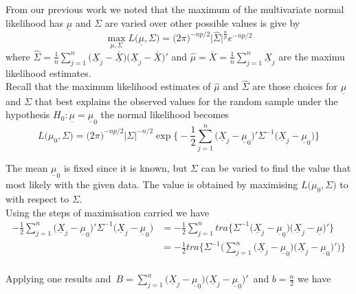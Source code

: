 \documentclass[11pt,a4paper]{article}
\theoremstyle{definition}
\begin{document}
From our previous work we noted that the maximum of the multivariate normal likelihood has $\underline{\mu}$ and $\Sigma$ are varied over other possible values is give by 
\begin{equation}\tag{1}
\max\limits_{\mu, \Sigma} L\big(\underline{\mu},\Sigma\big) = \big(2\pi\big)^{-np/2}\big|\widehat{\Sigma}\big|^{\frac{n}{p}}e^{-np/2}
\end{equation} where $\displaystyle{\widehat{\Sigma}=\frac{1}{n}\sum^n_{j=1}\big(\underline{X}_j-\overline{\underline{X}}\big)\big(\underline{X}_j-\overline{\underline{X}}\big)'}$ and $\displaystyle{\widehat{\mu}=\overline{X}=\frac{1}{n}\sum^n_{j=1}\underline{X}_j}$ are the maximu likelihood estimates.\\

Recall that the maximum likelihood estimates of $\widehat{\mu}$ and $\widehat{\Sigma}$ are those choices for $\underline{\mu}$ and $\Sigma$  that best explains the observed values for the random sample under the hypothesis $H_0:\underline{\mu} = \underline{\mu}_0$ the normal likelihood becomes
\begin{equation}\tag{2}
L\big(\mu_0,\Sigma\big)= \big(2\pi\big)^{-np/2}\big|\Sigma\big|^{-n/2}\exp\Big\{-\frac{1}{2}\sum^n_{j=1}\big(\underline{X}_j-\underline{\mu}_0\big)'\Sigma^{-1}\big(\underline{X}_j-\underline{\mu}_0\big)\Big\}
\end{equation}


The mean $\underline{\mu}_0$ is fixed since it is known, but $\Sigma$ can be varied to find the value that most likely with the given data. The value is obtained by maximising $L\big(\mu_0,\Sigma\big)$ to with respect to $\Sigma$.\\
Using the steps of maximisation carried we have
\begin{align*}
-\frac{1}{2}\sum^n_{j=1}\big(\underline{X}_j-\underline{\mu}_0\big)'\Sigma^{-1}\big(\underline{X}_j-\underline{\mu}_0\big) & = -\frac{1}{2}\sum^n_{j=1}tra\Big\{\Sigma^{-1}\big(\underline{X}_j-\underline{\mu}_0\big)\big(\underline{X}_j-\underline{\mu}\big)'\Big\}\\
& = -\frac{1}{2}tra\Big\{\Sigma^{-1}\Big(\sum^n_{j=1}\big(\underline{X}_j-\underline{\mu}_0\big)\big(\underline{X}_j-\underline{\mu}_0\big)'\Big)\Big\}\\
\end{align*}


Applying one results and \,$\displaystyle{B= \sum^n_{j=1}\big(\underline{X}_j-\underline{\mu}_0\big)\big(\underline{X}_j-\underline{\mu}_0\big)'}\,$ and $b= \frac{n}{2}$ we have 
\end{document}
